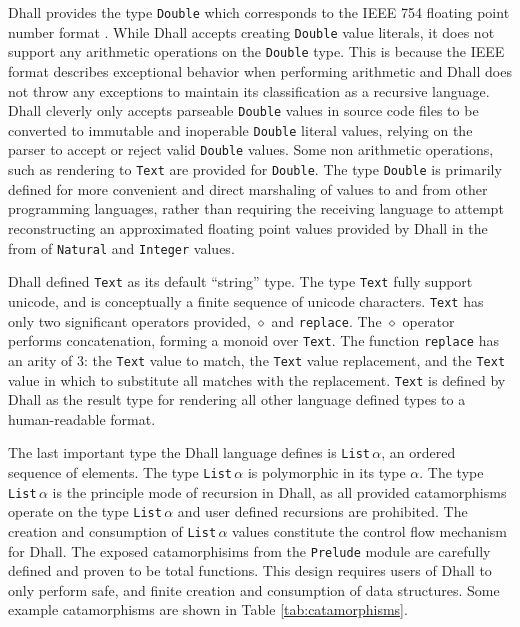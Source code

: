 \documentclass[12pt]{diazessay}
\newcommand{\Nat    }{\texttt{Natural}}
\newcommand{\Integer}{\texttt{Integer}}
\newcommand{\Double }{\texttt{Double}}
\begin{document}
Dhall provides the type \Double{} which corresponds to the IEEE 754 floating point number format \cite{30711}.
While Dhall accepts creating \Double{} value literals, it does not support any arithmetic operations on the \Double{} type.
This is because the IEEE format describes exceptional behavior when performing arithmetic and Dhall does not throw any exceptions to maintain its classification as a recursive language.
Dhall cleverly only accepts parseable \Double{} values in source code files to be converted to immutable and inoperable \Double{} literal values, relying on the parser to accept or reject valid \Double{} values.
Some non arithmetic operations, such as rendering to \texttt{Text} are provided for \Double{}.
The type \Double{} is primarily defined for more convenient and direct marshaling of values to and from other programming languages, rather than requiring the receiving language to attempt reconstructing an approximated floating point values provided by Dhall in the from of \Nat{} and \Integer{} values.

Dhall defined \texttt{Text} as its default ``string'' type.
The type \texttt{Text} fully support unicode, and is conceptually a finite sequence of unicode characters.
\texttt{Text} has only two significant operators provided, $\diamond$ and \texttt{replace}.
The $\diamond$ operator performs concatenation, forming a monoid \cite{cayley1863xxi} over \texttt{Text}.
The function \texttt{replace} has an arity of $3$: the \texttt{Text} value to match, the \texttt{Text} value replacement, and the \texttt{Text} value in which to substitute all matches with the replacement.
\texttt{Text} is defined by Dhall as the result type for rendering all other language defined types to a human-readable format.

The last important type the Dhall language defines is \texttt{List$\,\alpha$}, an ordered sequence of elements.
The type \texttt{List$\,\alpha$} is polymorphic in its type $\alpha$.
The type  \texttt{List$\,\alpha$} is the principle mode of recursion in Dhall, as all provided catamorphisms operate on the type \texttt{List$\,\alpha$} and user defined recursions are prohibited.
The creation and consumption of \texttt{List$\,\alpha$} values constitute the control flow mechanism for Dhall.
The exposed catamorphisims from the \texttt{Prelude} module are carefully defined and proven to be total functions.
This design requires users of Dhall to only perform safe, and finite creation and consumption of data structures.
Some example catamorphisms are shown in Table \ref{tab:catamorphisms}.
\end{document}
